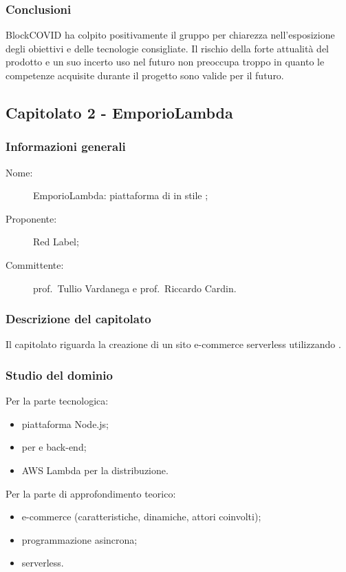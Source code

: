 \subsubsection{Conclusioni}
BlockCOVID ha colpito positivamente il gruppo per chiarezza nell'esposizione degli obiettivi e delle tecnologie consigliate. Il rischio della forte attualità del prodotto e un suo incerto uso nel futuro non preoccupa troppo in quanto le competenze acquisite durante il progetto sono valide per il futuro.

\subsection{Capitolato 2 - EmporioLambda}
\subsubsection{Informazioni generali}
\begin{description}
	\item[Nome:] EmporioLambda: piattaforma di  in stile ;
	\item[Proponente:] Red Label;
	\item[Committente:] prof.~Tullio Vardanega e prof.~Riccardo Cardin.
\end{description}
\subsubsection{Descrizione del capitolato}
Il capitolato riguarda la creazione di un sito e-commerce serverless utilizzando .
\subsubsection{Studio del dominio}
Per la parte tecnologica:
\begin{itemize}
	\item piattaforma Node.js;
	\item {} per  e back-end;
	\item AWS Lambda per la distribuzione.
\end{itemize}
Per la parte di approfondimento teorico:
\begin{itemize}
	\item e-commerce (caratteristiche, dinamiche, attori coinvolti);
	\item programmazione asincrona;
	\item {} serverless.
\end{itemize}
